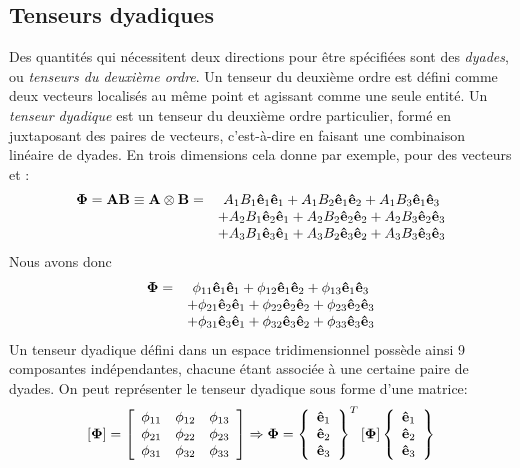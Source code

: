 \subsection{Tenseurs dyadiques}
Des quantités qui nécessitent deux directions pour être spécifiées sont des \emph{dyades}, ou \textit{tenseurs du deuxième ordre}. Un tenseur du deuxième ordre est défini comme deux vecteurs localisés au même point et agissant comme une seule entité. Un \emph{tenseur dyadique} est un tenseur du deuxième ordre particulier, formé en juxtaposant des paires de vecteurs, c'est-à-dire en faisant une combinaison linéaire de dyades. En trois dimensions cela donne par exemple, pour des vecteurs  et :
\begin{equation*}
\begin{array}{cc}
\mathbf{\Phi}=\textbf{A}\textbf{B}\equiv\textbf{A}\otimes\textbf{B}=&A_1B_1\textbf{ê}_1\textbf{ê}_1+A_1B_2\textbf{ê}_1\textbf{ê}_2+A_1B_3\textbf{ê}_1\textbf{ê}_3\\
 &+A_2B_1\textbf{ê}_2\textbf{ê}_1+A_2B_2\textbf{ê}_2\textbf{ê}_2+A_2B_3\textbf{ê}_2\textbf{ê}_3\\
 &+A_3B_1\textbf{ê}_3\textbf{ê}_1+A_3B_2\textbf{ê}_3\textbf{ê}_2+A_3B_3\textbf{ê}_3\textbf{ê}_3\\
\end{array}
\end{equation*}
Nous avons donc $$\begin{array}{cc}
\mathbf{\Phi}=&\phi_{11}\textbf{ê}_1\textbf{ê}_1+\phi_{12}\textbf{ê}_1\textbf{ê}_2+\phi_{13}\textbf{ê}_1\textbf{ê}_3\\
 &+\phi_{21}\textbf{ê}_2\textbf{ê}_1+\phi_{22}\textbf{ê}_2\textbf{ê}_2+\phi_{23}\textbf{ê}_2\textbf{ê}_3\\
 &+\phi_{31}\textbf{ê}_3\textbf{ê}_1+\phi_{32}\textbf{ê}_3\textbf{ê}_2+\phi_{33}\textbf{ê}_3\textbf{ê}_3\\
\end{array}$$
Un tenseur dyadique défini dans un espace tridimensionnel possède ainsi 9 composantes indépendantes, chacune étant associée à une certaine paire de dyades. On peut représenter le tenseur dyadique sous forme d'une matrice:
$$[\mathbf{\Phi}]=\left[\begin{array}{ccc}
\phi_{11}&\phi_{12}&\phi_{13}\\
\phi_{21}&\phi_{22}&\phi_{23}\\
\phi_{31}&\phi_{32}&\phi_{33}
\end{array}\right]\Rightarrow \mathbf{\Phi}=\left\{\begin{array}{c}
\textbf{ê}_1\\
\textbf{ê}_2\\
\textbf{ê}_3\\
\end{array}\right\}^T [\mathbf{\Phi}]\left\{
\begin{array}{c}
\textbf{ê}_1\\
\textbf{ê}_2\\
\textbf{ê}_3\\
\end{array}\right\} $$
